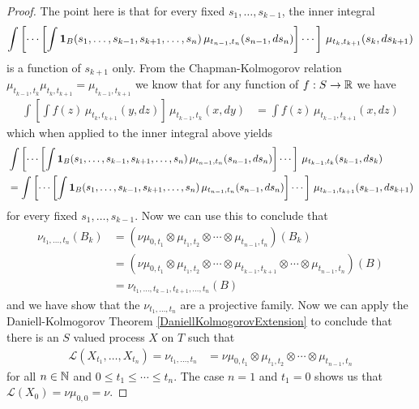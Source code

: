 \begin{proof}
The point here is that for every fixed $s_1, \dotsc, s_{k-1}$, the inner integral
\begin{align*}
\int \left[ \dotsb \left [ \int \textbf{1}_{B}(s_1,
    \dotsc, s_{k-1}, s_{k+1}, \dotsc, s_n) \, \mu_{t_{n-1},t_n}(s_{n-1}, ds_n) \right] \dotsb \right] \, \mu_{t_k, t_{k+1}}(s_k, ds_{k+1}) 
\end{align*}
is a function of $s_{k+1}$ only.  From the Chapman-Kolmogorov relation
$\mu_{t_{k-1}, t_k} \mu_{t_{k}, t_{k+1}}  = \mu_{t_{k-1}, t_{k+1}}$ we
know that for any function of $f : S \to \mathbb{R}$ we have 
\begin{align*}
\int \left [
  \int
f(z) \, \mu_{t_{k}, t_{k+1}} (y, dz) \right ] \, \mu_{t_{k-1}, t_k}
(x, dy) &= \int
f(z) \, \mu_{t_{k-1}, t_{k+1}} (x, dz) 
\end{align*}
which when applied to the inner integral above yields
\begin{align*}
&\int \left[ \dotsb \left [ \int \textbf{1}_{B}(s_1,
    \dotsc, s_{k-1}, s_{k+1}, \dotsc, s_n) \,
    \mu_{t_{n-1},t_n}(s_{n-1}, ds_n) \right] \dotsb \right] \, \mu_{t_{k-1},
t_{k}}(s_{k-1}, ds_{k}) \\
&=\int \left[ \dotsb \left [ \int \textbf{1}_{B}(s_1,
    \dotsc, s_{k-1}, s_{k+1}, \dotsc, s_n) \,
    \mu_{t_{n-1},t_n}(s_{n-1}, ds_n) \right] \dotsb \right] \,
\mu_{t_{k-1}, t_{k+1}}(s_{k-1}, ds_{k+1})
\end{align*}
for every fixed $s_1, \dotsc, s_{k-1}$.  Now we can use this to
conclude that 
\begin{align*}
\nu_{t_1, \dotsc, t_n}(B_k) &= ( \nu \mu_{0,t_1} \otimes \mu_{t_1, t_2}
\otimes \dotsb \otimes \mu_{t_{n-1}, t_n})(B_k) \\
&= ( \nu \mu_{0,t_1} \otimes \mu_{t_1, t_2} \otimes \dotsb \otimes
\mu_{t_{k-1}, t_{k+1}} \otimes \dotsb \otimes \mu_{t_{n-1}, t_n})(B)
\\
&=\nu_{t_1, \dotsc, t_{k-1}, t_{k+1}, \dotsc, t_n}(B)
 \end{align*}
and we have show that the $\nu_{t_1, \dotsc, t_n}$ are a projective
family.
Now we can apply the Daniell-Kolmogorov Theorem
\ref{DaniellKolmogorovExtension} to conclude that there is an $S$
valued process $X$ on $T$ such that 
\begin{align*}
\mathcal{L}(X_{t_1}, \dotsc, X_{t_n}) = \nu_{t_1, \dotsc, t_n} &= \nu \mu_{0,t_1} \otimes \mu_{t_1, t_2}
\otimes \dotsb \otimes \mu_{t_{n-1}, t_n}
\end{align*}
for all $n \in \mathbb{N}$ and $0 \leq t_1 \leq \dotsb \leq t_n$.  The
case $n=1$ and $t_1 = 0$ shows us that $\mathcal{L}(X_0) = \nu
\mu_{0,0} = \nu$.


\end{proof}
